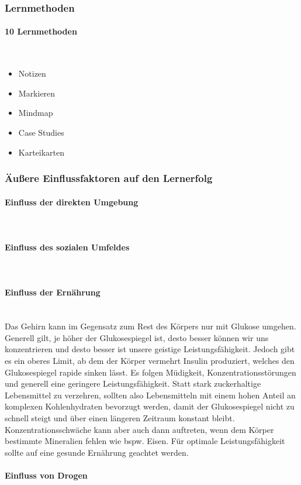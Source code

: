 \subsubsection{Lernmethoden}

\paragraph{10 Lernmethoden}~\\
\begin{itemize}
	\item Notizen
	\item Markieren
	\item Mindmap
	\item Case Studies
	\item Karteikarten
\end{itemize}

\subsubsection{Äußere Einflussfaktoren auf den Lernerfolg}
\paragraph{Einfluss der direkten Umgebung}~\\
\paragraph{Einfluss des sozialen Umfeldes}~\\
\paragraph{Einfluss der Ernährung}~\\
Das Gehirn kann im Gegensatz zum Rest des Körpers nur mit Glukose umgehen. Generell gilt, je höher der Glukosespiegel ist, desto besser können wir uns konzentrieren und desto besser ist unsere geistige Leistungsfähigkeit. Jedoch gibt es ein oberes Limit, ab dem der Körper vermehrt Insulin produziert, welches den Glukosespiegel rapide sinken lässt. Es folgen Müdigkeit, Konzentrationsstörungen und generell eine geringere Leistungsfähigkeit. Statt stark zuckerhaltige Lebensmittel zu verzehren, sollten also Lebensmitteln mit einem hohen Anteil an komplexen Kohlenhydraten bevorzugt werden, damit der Glukosespiegel nicht zu schnell steigt und über einen längeren Zeitraum konstant bleibt.
Konzentrationsschwäche kann aber auch dann auftreten, wenn dem Körper bestimmte Mineralien fehlen wie bspw. Eisen. Für optimale Leistungsfähigkeit sollte auf eine gesunde Ernährung geachtet werden.
\paragraph{Einfluss von Drogen}~\\

